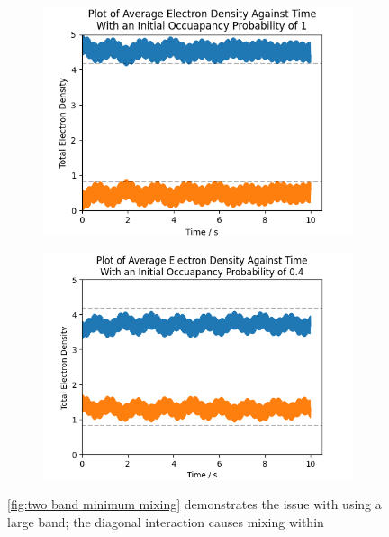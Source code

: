 \begin{figure}[htbp]
\begin{subfigure}{0.45\linewidth}
    \end{subfigure}
    \begin{subfigure}{0.45\linewidth}
        \includegraphics[width=0.9\linewidth]{Figures/Simulation/Two Small Bands Large Probability Incorrect Equilibrium.png}
        \label{fig:two band incorrect equilibrium above}
    \end{subfigure}
    \begin{subfigure}{0.45\linewidth}
        \includegraphics[width=0.9\linewidth]{Figures/Simulation/Two Small Bands Small Probability Incorrect Equilibrium.png}
        \label{fig:two band incorrect equilibrium below}
    \end{subfigure}
    \caption{
        \cref{fig:two band minimum mixing}
        demonstrates the issue with
        using a large band; the diagonal
        interaction causes mixing within
}
\end{figure}
